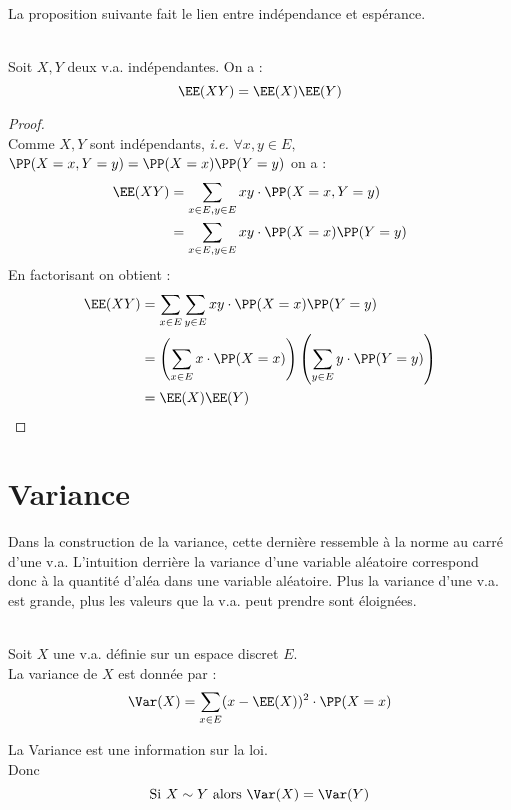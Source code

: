 \documentclass[12pt,fleqn]{report} %
\begin{document}
La proposition suivante fait le lien entre indépendance et espérance.
\begin{proposition}\text{ }\\
	Soit $X,Y$ deux v.a. indépendantes. On a :
	\[
	\EE(XY) = \EE(X)\EE(Y)
	\]
\end{proposition}
\begin{proof}\text{ }\\
	Comme $X,Y$ sont indépendants, \emph{i.e.} $\forall x,y \in E,$ $\PP(X = x,Y = y) = \PP(X = x)\PP(Y = y)$ on a :
	\begin{align*}
	\EE(XY) & = \sum\limits_{x\in E,y\in E} xy\cdot\PP(X = x,Y = y) \\
	& = \sum\limits_{x\in E,y\in E} xy\cdot \PP(X = x)\PP(Y = y)
	\end{align*}
	En factorisant on obtient : 
	\begin{align*}
	\EE(XY) & = \sum\limits_{x\in E} \sum\limits_{y\in E} xy\cdot \PP(X = x)\PP(Y = y) \\
	& = \left(\sum\limits_{x\in E} x\cdot \PP(X = x) \right)\left( \sum\limits_{y\in E} y\cdot \PP(Y = y)\right) \\
	& = \EE(X)\EE(Y)
	\end{align*}
\end{proof}


\section{Variance}
Dans la construction de la variance, cette dernière  ressemble à la norme au carré d'une v.a. L'intuition derrière la variance d'une variable aléatoire correspond donc à la quantité d'aléa dans une variable aléatoire. Plus la variance d'une v.a. est grande, plus les valeurs que la v.a. peut prendre sont éloignées.
\pagebreak
\begin{definition}\text{ }\\
	Soit $X$ une v.a. définie sur un espace discret $E$.\\ La variance de $X$ est donnée par : 
	\[
	\Var(X) = \sum\limits_{x \in E} (x - \EE(X))^2 \cdot \PP(X = x)
	\]
\end{definition}

\begin{remark}
	La Variance est une information sur la loi.\\ Donc\[
	\text{Si } X \sim Y \text{ alors } \Var(X) = \Var(Y)
	\]
	
\end{remark}
\end{document}
